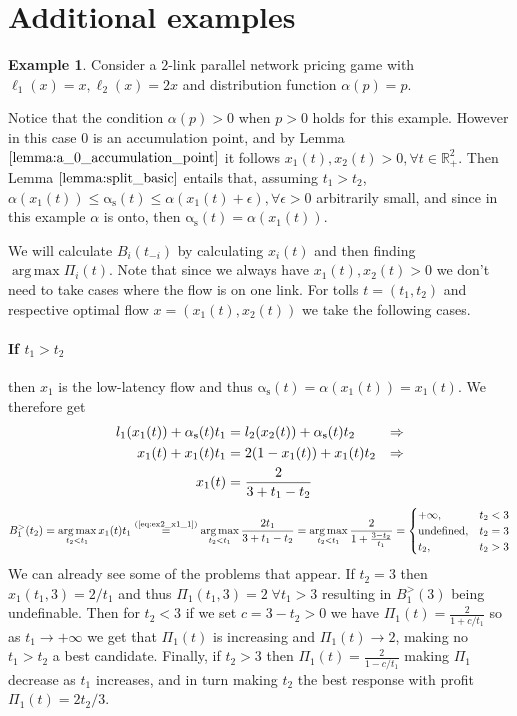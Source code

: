 \documentclass[10pt,a4paper]{book}
\newcommand{\indeq}[1]{\stackrel{\text{#1}}{=}}
\newcommand{\as}{\mathrm{\alpha_s}}
\newcommand{\R}{\mathbb{R}}
\DeclareMathOperator*{\argmax}{arg\,max}
\theoremstyle{definition}
\theoremstyle{comment}
\newtheorem{example}[definition]{Example}
\begin{document}
\section*{Additional examples}

\begin{example}
	\label{example:ap_p}
	Consider a $2$-link parallel network pricing game with $\ell_1(x) = x, \ell_2(x) = 2x$ and distribution function $\alpha(p) = p$.
\end{example}

Notice that the condition $\alpha(p) > 0$ when $p > 0$ holds for this example.
However in this case $0$ is an accumulation point, and by Lemma $\ref{lemma:a_0_accumulation_point}$ it follows $x_1(t), x_2(t) > 0, \forall t \in \R_+^2$.
Then Lemma $\ref{lemma:split_basic}$ entails that, assuming $t_1 > t_2$, $\alpha(x_1(t)) \le \as(t) \le \alpha(x_1(t) + \epsilon), \forall \epsilon > 0$ arbitrarily small, and since in this example $\alpha$ is onto, then $\as(t) = \alpha(x_1(t))$.

We will calculate $B_i(t_{-i})$ by calculating $x_i(t)$ and then finding $\argmax \Pi_i(t)$.
Note that since we always have $x_1(t), x_2(t) > 0$ we don't need to take cases where the flow is on one link.
For tolls $t = (t_1, t_2)$ and respective optimal flow $x = (x_1(t), x_2(t))$ we take the following cases.

\paragraph{If $t_1 > t_2$}
then $x_1$ is the low-latency flow and thus $\as(t) = \alpha(x_1(t)) = x_1(t)$.
We therefore get
\begin{align}
	l_1(x_1(t)) + \as(t) t_1 &= l_2(x_2(t)) + \as(t) t_2 &\Rightarrow \notag \\
	x_1(t) + x_1(t) t_1 &= 2 (1 - x_1(t)) + x_1(t) t_2 &\Rightarrow \notag \\
	x_1(t) &= \frac{2}{3 + t_1 - t_2} \label{eq:ex2_x1_1}
\end{align}
\[
	B_1^>(t_2) = \argmax_{t_2 < t_1} x_1(t) t_1 \indeq{(\ref{eq:ex2_x1_1})} \argmax_{t_2 < t_1} \frac{2 t_1}{3 + t_1 - t_2} = \argmax_{t_2 < t_1} \frac{2}{1 + \frac{3 - t_2}{t_1}} =
		\begin{cases}
			+\infty, & t_2 < 3 \\
			\textrm{undefined}, & t_2 = 3 \\
			t_2, & t_2 > 3 \\
		\end{cases}
\]
We can already see some of the problems that appear.
If $t_2 = 3$ then $x_1(t_1, 3) = 2/t_1$ and thus $\Pi_1(t_1, 3) = 2 \; \forall t_1 > 3$ resulting in $B_1^>(3)$ being undefinable.
Then for $t_2 < 3$ if we set $c = 3 - t_2 > 0$ we have $\Pi_1(t) = \frac{2}{1 + c/t_1}$ so as $t_1 \rightarrow +\infty$ we get that $\Pi_1(t)$ is increasing and $\Pi_1(t) \rightarrow 2$, making no $t_1 > t_2$ a best candidate.
Finally, if $t_2 > 3$ then $\Pi_1(t) = \frac{2}{1 - c/t_1}$ making $\Pi_1$ decrease as $t_1$ increases, and in turn making $t_2$ the best response with profit $\Pi_1(t) = {2 t_2}/3$.
\end{document}
